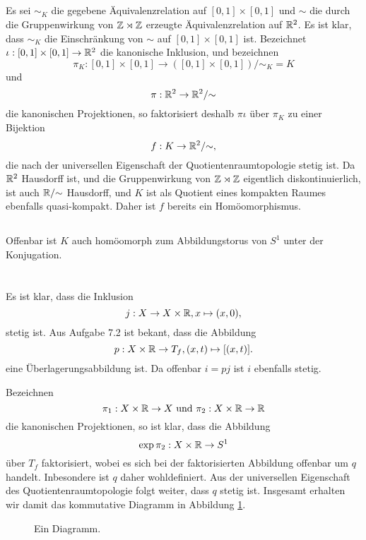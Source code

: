 \documentclass[a4paper,10pt]{article}
\begin{document}
\subsection{}
Es sei $\sim_K$ die gegebene Äquivalenzrelation auf $[0,1] \times [0,1]$ und $\sim$ die durch die Gruppenwirkung von $\mathbb{Z} \rtimes \mathbb{Z}$ erzeugte Äquivalenzrelation auf $\mathbb{R}^2$. Es ist klar, dass $\sim_K$ die Einschränkung von $\sim$ auf $[0,1] \times [0,1]$ ist. Bezeichnet $\iota : [0,1] \times [0,1] \to \mathbb{R}^2$ die kanonische Inklusion, und bezeichnen
\[
 \pi_K : [0,1] \times [0,1] \to ([0,1] \times [0,1])/{\sim_K} = K
\]
und
\[
 \pi : \mathbb{R}^2 \to \mathbb{R}^2 / {\sim}
\]
die kanonischen Projektionen, so faktorisiert deshalb $\pi \iota$ über $\pi_K$ zu einer Bijektion
\[
 f : K \to \mathbb{R}^2/{\sim},
\]
die nach der universellen Eigenschaft der Quotientenraumtopologie stetig ist. Da $\mathbb{R}^2$ Hausdorff ist, und die Gruppenwirkung von $\mathbb{Z} \rtimes \mathbb{Z}$ eigentlich diskontinuierlich, ist auch $\mathbb{R}/{\sim}$ Hausdorff, und $K$ ist als Quotient eines kompakten Raumes ebenfalls quasi-kompakt. Daher ist $f$ bereits ein Homöomorphismus.


\subsection{}
Offenbar ist $K$ auch homöomorph zum Abbildungstorus von $S^1$ unter der Konjugation.





\section{}
Es ist klar, dass die Inklusion
\[
 j : X \to X \times \mathbb{R}, x \mapsto (x,0),
\]
stetig ist. Aus Aufgabe 7.2 ist bekant, dass die Abbildung
\[
 p : X \times \mathbb{R} \to T_f, (x,t) \mapsto [(x,t)].
\]
eine Überlagerungsabbildung ist. Da offenbar $i = pj$ ist $i$ ebenfalls stetig.

Bezeichnen
\[
 \pi_1 : X \times \mathbb{R} \to X \text{ und } \pi_2 : X \times \mathbb{R} \to \mathbb{R}
\]
die kanonischen Projektionen, so ist klar, dass die Abbildung
\[
 \exp \pi_2 : X \times \mathbb{R} \to S^1
\]
über $T_f$ faktorisiert, wobei es sich bei der faktorisierten Abbildung offenbar um $q$ handelt. Inbesondere ist $q$ daher wohldefiniert. Aus der universellen Eigenschaft des Quotientenraumtopologie folgt weiter, dass $q$ stetig ist. Insgesamt erhalten wir damit das kommutative Diagramm in Abbildung \ref{fig: großes Diagramm}.
\begin{figure}\centering
 \caption{Ein Diagramm.}
 \label{fig: großes Diagramm}
\end{figure}
\end{document}

